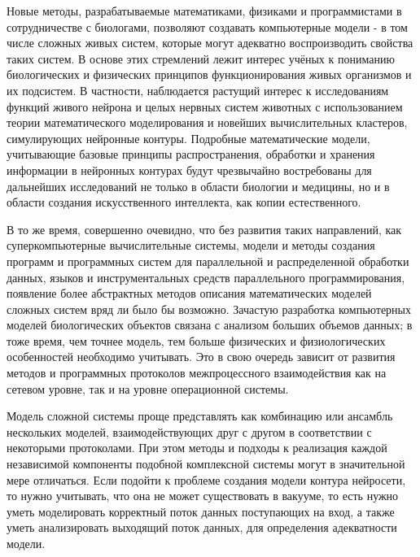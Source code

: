 
Новые методы, разрабатываемые математиками, физиками и программистами в сотрудничестве с биологами, позволяют создавать компьютерные модели - в том числе сложных живых систем, которые могут адекватно воспроизводить свойства таких систем. В основе этих стремлений лежит интерес учёных к пониманию биологических и физических принципов функционирования живых организмов и их подсистем. В частности, наблюдается растущий интерес к исследованиям функций живого нейрона и целых нервных систем животных с использованием теории математического моделирования и новейших вычислительных кластеров, симулирующих нейронные контуры. Подробные математические модели, учитывающие базовые принципы распространения, обработки и хранения информации в нейронных контурах будут чрезвычайно востребованы для дальнейших исследований не только в области биологии и медицины, но и в области создания искусственного интеллекта, как копии естественного. 

В то же время, совершенно очевидно, что без развития таких направлений,  как  суперкомпьютерные вычислительные системы, модели и методы создания программ и программных систем для параллельной и распределенной обработки данных, языков и инструментальных средств параллельного программирования, появление более абстрактных методов описания математических моделей сложных систем вряд ли было бы возможно. Зачастую разработка компьютерных моделей биологических объектов связана с анализом больших объемов данных; в тоже время, чем точнее модель, тем больше физических и физиологических особенностей необходимо учитывать. Это в свою очередь зависит от развития методов и программных протоколов межпроцессного взаимодействия как на сетевом уровне, так и на уровне операционной системы.

{\actuality} Модель сложной системы проще представлять как комбинацию или ансамбль нескольких моделей, взаимодействующих друг с другом в соответствии с некоторыми протоколами. При этом методы и подходы к реализация каждой независимой компоненты подобной комплексной системы могут в значительной мере отличаться. Если подойти к проблеме создания модели контура нейросети, то нужно учитывать, что она не может существовать в вакууме, то есть нужно уметь моделировать корректный поток данных поступающих на вход, а также уметь анализировать выходящий поток данных, для определения адекватности модели.

